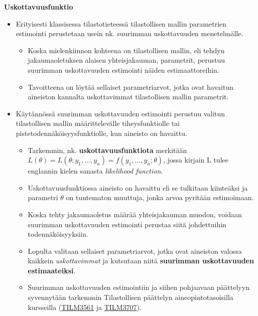 \documentclass[
]{book}
\providecommand{\tightlist}{%
  \setlength{\itemsep}{0pt}\setlength{\parskip}{0pt}}
\begin{document}
\textbf{Uskottavuusfunktio}

\begin{itemize}
\tightlist
\item
  Erityisesti klassisessa tilastotieteessä tilastollisen mallin parametrien estimointi perustetaan usein nk. suurimman uskottavuuden menetelmälle.

  \begin{itemize}
  \tightlist
  \item
    Koska mielenkiinnon kohteena on tilastollisen mallin, eli tehdyn jakaumaoletuksen alaisen yhteisjakauman, parametrit, perustuu suurimman uskottavuuden estimointi näiden estimaattoreihin.
  \item
    Tavoitteena on löytää sellaiset parametriarvot, jotka ovat havaitun aineiston kannalta uskottavimmat tilastollisen mallin parametrit.
  \end{itemize}
\item
  Käytännössä suurimman uskottavuuden estimointi perustuu valitun tilastollisen mallin määrittelevälle tiheysfunktiolle tai pistetodennäköisyysfunktiolle, kun aineisto on havaittu.

  \begin{itemize}
  \tightlist
  \item
    Tarkemmin, nk. \textbf{uskottavuusfunktiota} merkitään \(L(\theta) = L(\theta;y_1,\dots,y_n) = f(y_1,\dots,y_n;\theta)\), jossa kirjain L tulee englannin kielen sanasta \emph{likelihood function}.
  \item
    Uskottavuusfunktiossa aineisto on havaittu eli se tulkitaan kiinteäksi ja parametri \(\theta\) on tuntematon muuttuja, jonka arvoa pyritään estimoimaan.
  \item
    Koska tehty jakaumaoletus määrää yhteisjakauman muodon, voidaan suurimman uskottavuuden estimointi perustaa siitä johdettuihin todennäköisyyksiin.
  \item
    Lopulta valitaan sellaiset parametriarvot, jotka ovat aineiston valossa kaikkein \emph{uskottavimmat} ja kutsutaan niitä \textbf{suurimman uskottavuuden estimaateiksi}.
  \item
    Suurimman uskottavuuden estimointiin ja siihen pohjaavaan päättelyyn syvennytään tarkemmin Tilastollisen päättelyn aineopintotasoisilla kursseilla (\href{https://opas.peppi.utu.fi/fi/opintojakso/TILM3561/5069?period=2024-2027}{TILM3561} ja \href{https://opas.peppi.utu.fi/fi/opintojakso/TILM3707/100872?period=2024-2027}{TILM3707}).
  \end{itemize}
\end{itemize}
\end{document}

